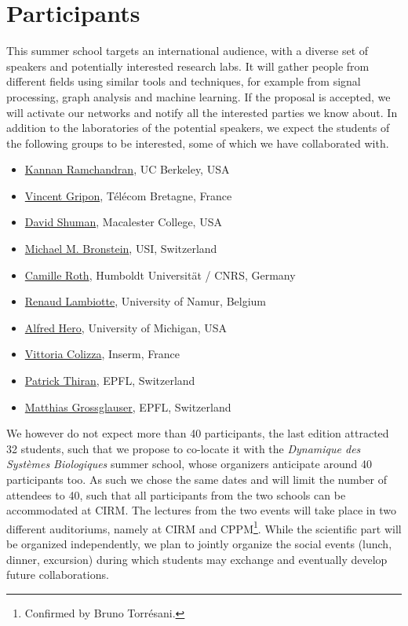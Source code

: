 \documentclass[a4paper]{scrartcl}
\begin{document}
\section{Participants}

This summer school targets an international audience, with a diverse set of
speakers and potentially interested research labs. It will gather people from
different fields using similar tools and techniques, for example from signal
processing, graph analysis and machine learning. If the proposal is accepted, we
will activate our networks and notify all the interested parties we know about.
In addition to the laboratories of the potential speakers, we expect the
students of the following groups to be interested, some of which we have
collaborated with.
\begin{itemize}
	\setlength{\itemsep}{0pt} \setlength{\parskip}{0pt}
	\item \href{https://www.eecs.berkeley.edu/~kannanr/}
		{Kannan Ramchandran}, UC Berkeley, USA
	\item \href{http://www.vincent-gripon.com/}
		{Vincent Gripon}, Télécom Bretagne, France
	\item \href{http://www.macalester.edu/~dshuman1/}
		{David Shuman}, Macalester College, USA
	\item \href{http://www.inf.usi.ch/bronstein/}
		{Michael M. Bronstein}, USI, Switzerland
	\item \href{http://camille.roth.free.fr/index.php}
		{Camille Roth}, Humboldt Universität / CNRS, Germany
	\item \href{http://xn.unamur.be/}
		{Renaud Lambiotte}, University of Namur, Belgium
	\item \href{https://web.eecs.umich.edu/~hero/}
		{Alfred Hero}, University of Michigan, USA
	\item \href{http://www.epicx-lab.com/vittoria-colizza.html}
		{Vittoria Colizza}, Inserm, France
	\item \href{http://people.epfl.ch/patrick.thiran}
		{Patrick Thiran}, EPFL, Switzerland
	\item \href{http://icapeople.epfl.ch/grossglauser/}
		{Matthias Grossglauser}, EPFL, Switzerland
\end{itemize}

We however do not expect more than 40 participants, the last edition attracted
32 students, such that we propose to co-locate it with the \textit{Dynamique des
Systèmes Biologiques} summer school, whose organizers anticipate around 40
participants too. As such we chose the same dates and will limit the number of
attendees to 40, such that all participants from the two schools can be
accommodated at CIRM. The lectures from the two events will take place in two
different auditoriums, namely at CIRM and CPPM\footnote{Confirmed by Bruno
Torrésani.}. While the scientific part will be organized independently, we plan
to jointly organize the social events (lunch, dinner, excursion) during which
students may exchange and eventually develop future collaborations.
\end{document}

